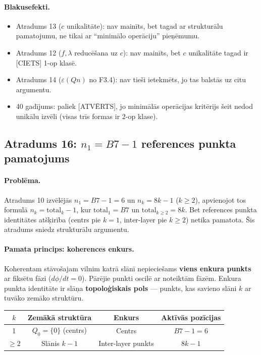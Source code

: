 \documentclass[12pt,a4paper]{article}
\begin{document}
\paragraph{Blakusefekti.}
\begin{itemize}
    \item Atradums 13 ($c$ unikalitāte): nav mainīts, bet tagad ar strukturālu pamatojumu, ne tikai ar ``minimālo operāciju'' pieņēmumu.
    \item Atradums 12 ($f, \lambda$ reducēšana uz $c$): nav mainīts, bet $c$ unikalitāte tagad ir [CIETS] 1-op klasē.
    \item Atradums 14 ($\varepsilon(Qn)$ no F3.4): nav tieši ietekmēts, jo tas balstās uz citu argumentu.
    \item 40 gadījums: paliek [ATVĒRTS], jo minimālās operācijas kritērijs šeit nedod unikālu izvēli (visas trīs formas ir 2-op klase).
\end{itemize}

\subsection*{Atradums 16: $n_1 = B7-1$ references punkta pamatojums}

\paragraph{Problēma.}
Atradums 10 izvēlējās $n_1 = B7-1 = 6$ un $n_k = 8k-1$ ($k\geq 2$), apvienojot tos formulā $n_k = \text{total}_k - 1$, kur $\text{total}_1 = B7$ un $\text{total}_{k\geq 2} = 8k$. Bet references punkta identitātes atšķirība (centrs pie $k=1$, inter-layer pie $k\geq 2$) netika pamatota. Šis atradums sniedz strukturālu argumentu.

\paragraph{Pamata princips: koherences enkurs.}
Koherentam stāvošajam vilnim katrā slānī nepieciešams \textbf{viens enkura punkts} ar fiksētu fāzi ($d\phi/dt = 0$). Pārējie punkti oscilē ar noteiktām fāzēm. Enkura punkta identitāte ir slāņa \textbf{topoloģiskais pols} — punkts, kas savieno slāni $k$ ar tuvāko zemāko struktūru.

\begin{table}[h]
\centering
\begin{tabular}{|c|c|c|c|}
\hline
$k$ & \textbf{Zemākā struktūra} & \textbf{Enkurs} & \textbf{Aktīvās pozīcijas} \\
\hline
1 & $Q_0 = \{0\}$ (centrs) & Centrs & $B7 - 1 = 6$ \\
$\geq 2$ & Slānis $k-1$ & Inter-layer punkts & $8k - 1$ \\
\hline
\end{tabular}
\end{table}
\end{document}
